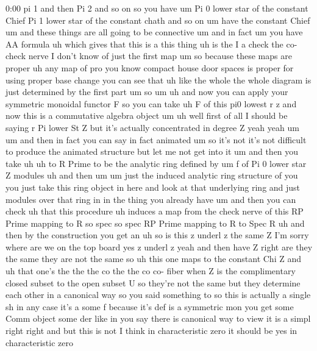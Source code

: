 \begin{unfinished}{0:00}
pi  1  and  then  Pi  2  and  so  on  so  you  have
um
Pi  0  lower  star  of  the  constant  Chief  Pi
1  lower  star  of  the  constant
chath  and  so  on  um  have  the  constant
Chief
um  and  these  things  are  all  going  to  be
connective  um  and  in  fact
um  you  have  AA
formula  uh  which  gives  that  this  is  a
this
thing  uh  is  the  I  a  check  the  co-  check
nerve  I  don't  know  of  just  the  first
map  um  so  because  these  maps  are  proper
uh  any  map  of  pro  you  know  compact  house
door  spaces  is  proper  for  using  proper
base  change  you  can  see  that  uh  like  the
whole  the  whole  diagram  is  just
determined  by  the  first  part
um  so
um  uh  and  now  you  can  apply  your
symmetric  monoidal  functor  F  so  you  can
take  uh  F  of  this  pi0  lowest  r  z  and  now
this  is  a  commutative  algebra  object
um  uh  well  first  of  all  I  should  be
saying  r  Pi  lower  St  Z  but  it's  actually
concentrated  in  degree
Z
yeah  yeah
um
um  and  then  in  fact  you  can
say  in  fact
animated  um  so  it's  not  it's  not
difficult  to  produce  the  animated
structure  but  let  me  not  get  into
it  um  and  then  you  take
uh  uh  to  R  Prime  to  be  the  analytic  ring
defined  by  um  f  of  Pi  0  lower  star  Z
modules
uh  and  then
um
um  just  the  induced  analytic  ring
structure  of  you  you  just  take  this  ring
object  in  here  and  look  at  that
underlying  ring  and  just  modules  over
that  ring  in  in  the  thing  you  already
have
um  and  then  you  can
check  uh  that  this  procedure  uh  induces
a  map  from  the  check  nerve  of  this  RP
Prime  mapping  to  R  so  spec  so  spec  RP
Prime  mapping  to
R  to  Spec
R  uh  and  then  by  the  construction  you
get  an
uh  so  is  this  z  underl  z  the  same  Z  I'm
sorry  where  are  we  on  the  top  board  yes
z  underl  z  yeah  and  then  have  Z  right
are  they  the  same  they  are  not  the  same
so  uh  this  one  maps  to  the  constant  Chi
Z  and  uh  that  one's  the  the  the  co  the
the  co  co-  fiber  when  Z  is  the
complimentary  closed  subset  to  the  open
subset  U  so  they're  not  the  same  but
they  determine  each  other  in  a  canonical
way  so  you  said  something
to  so  this  is  actually  a  single  sh  in
any  case  it's  a  some  f  because  it's  def
is  a  symmetric  mon  you  get  some  Comm
object  some  der  like  in  you  say  there  is
canonical  way  to  view  it  is  a  simpl
right  right  and  but  this  is
not  I  think  in  characteristic  zero  it
should  be  yes  in  characteristic  zero

\end{unfinished}
